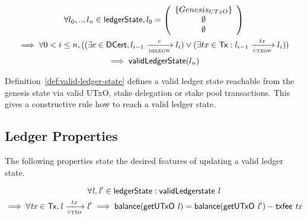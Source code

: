 \begin{definition}
  \begin{multline*}
    \label{eq:2}
    \forall l_{0},..,l_{n} \in \ledgerState, l_{0} =
    \left(
      \begin{array}{c}
        \left\{
        \genesisUTxO
        \right\} \\
        \emptyset\\
        \emptyset\\
      \end{array}
    \right)  \\
    \implies \forall 0 < i \leq n, ((\exists c \in \DCert, l_{i-1}
    \trans{delegw}{c} l_{i}) \vee (\exists tx \in \Tx: l_{i-1} \trans{utxow}{tx}
    l_{i}))\\ \implies \fun{validLedgerState}(l_{n})
  \end{multline*}
  \label{def:valid-ledger-state}
\end{definition}

Definition~\ref{def:valid-ledger-state} defines a valid ledger state reachable
from the genesis state via valid UTxO, stake delegation or stake pool
transactions. This gives a constructive rule how to reach a valid ledger state.

\subsection{Ledger Properties}
\label{sec:ledger-properties}

The following properties state the desired features of updating a valid ledger
state.

\begin{property}
  \begin{multline*}
    \forall \var{l}, \var{l'} \in \ledgerState: \fun{validLedgerstate}~\var{l}\\
    \implies \forall \var{tx} \in \Tx, \var{l} \trans{utxo}{tx} \var{l'}
    \implies \fun{balance}(\fun{getUTxO}~\var{l}) =
    \fun{balance}(\fun{getUTxO}~\var{l'}) - \fun{txfee}~\var{tx}
  \end{multline*}
  \label{prop:ledger-properties-1}
\end{property}

